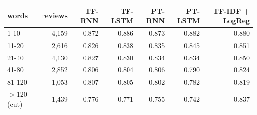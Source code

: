 \begin{tabular}{lrrrrrr}
\toprule
words & reviews & TF-RNN & TF-LSTM & PT-RNN & PT-LSTM & TF-IDF + LogReg \\
\midrule
1-10 & 4{,}159 & 0.872 & 0.886 & 0.873 & 0.882 & 0.880 \\
11-20 & 2{,}616 & 0.826 & 0.838 & 0.835 & 0.845 & 0.851 \\
21-40 & 4{,}130 & 0.827 & 0.830 & 0.834 & 0.834 & 0.850 \\
41-80 & 2{,}852 & 0.806 & 0.804 & 0.806 & 0.790 & 0.824 \\
81-120 & 1{,}053 & 0.807 & 0.805 & 0.802 & 0.782 & 0.819 \\
$>$120 (cut) & 1{,}439 & 0.776 & 0.771 & 0.755 & 0.742 & 0.837 \\
\bottomrule
\end{tabular}